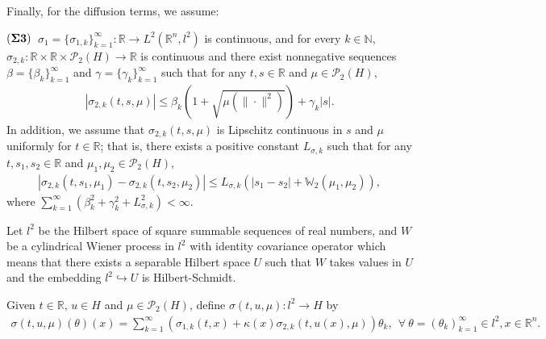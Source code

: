 \documentclass[11pt]{article}
\numberwithin{equation}{section}
\theoremstyle{plain}
\def\leq{\leqslant}
\begin{document}
Finally, for
   the diffusion terms, we assume:

  \noindent
 $({\bf \Sigma 3})$\
   $\sigma_1 = \{ \sigma_{1,k} \}_{k=1}^\infty : \mathbb{R} \rightarrow L^2(\mathbb{R}^n, l^2)$ is continuous,
   and for every $k\in \mathbb{N}$,
   $\sigma_{2,k}:
    \mathbb{R}   \times \mathbb{R} \times \mathcal {P}_2(H)
   \rightarrow \mathbb{R}$
   is continuous and
     there exist nonnegative sequences
   $\beta=\{\beta_{k}\}_{k=1}^\infty$ and $\gamma=\{\gamma_{k}\}_{k=1}^\infty$
   such that for any $t, s \in \mathbb{R}$ and $\mu \in \mathcal {P}_2(H)$,
   \begin{align}\label{sigma1}
       | \sigma_{2,k}(t,s,\mu ) | \leq \beta_{k} \left( 1 + \sqrt{ \mu( \|\cdot\|^2) } \right) + \gamma_{k} |s|.
   \end{align}
   In addition, we assume that  $\sigma_{2,k}(t,s,\mu)$ is Lipschitz continuous in
   $s$ and $\mu$
   uniformly for $t \in \mathbb{R}$;
    that is,
   there exists a positive constant $L_{\sigma,k}$ such that
   for any $t, s_1, s_2 \in \mathbb{R}$ and $\mu_1, \mu_2 \in \mathcal {P}_2(H)$,
  \begin{align} \label{sigma2}
      | \sigma_{2,k}(t, s_1, \mu_1) - \sigma_{2,k}(t, s_2, \mu_2) |
      \leq L_{\sigma,k} \left( | s_1 - s_2 | + \mathbb{W}_2 (\mu_1, \mu_2) \right),
  \end{align}
  where
       $ \sum_{k=1}^\infty
                  \left( \beta_{k}^2 + \gamma_{k}^2 + L_{\sigma,k}^2
                  \right)
        < \infty$.




 Let
     $l^2$
     be the Hilbert space of square summable sequences of real numbers,
     and   $W$ be a cylindrical
Wiener process in $l^2$ with
identity covariance operator
which means that there exists
a separable Hilbert space
$U$ such that
$W$ takes values in $U$ and   the
embedding $l^2 \hookrightarrow U$ is  Hilbert-Schmidt.

 Given $t \in \mathbb{R} $, $u \in H$ and $\mu \in \mathcal {P}_2(H)$,
 define $\sigma(t,u,\mu): l^2 \rightarrow H$ by
\begin{align}\label{sigmadef}
  \sigma (t,u,\mu)(\theta)(x)
   = \sum_{k=1}^{\infty}
                       \left( \sigma_{1,k} (t,x)
                              + \kappa(x) \sigma_{2,k} (t, u(x), \mu)
                       \right) \theta_k,\ \
                                 \forall\ \theta =(\theta_k)_{k=1}^{\infty}\in l^2,
                                           x \in \mathbb{R}^n.
\end{align}
\end{document}
